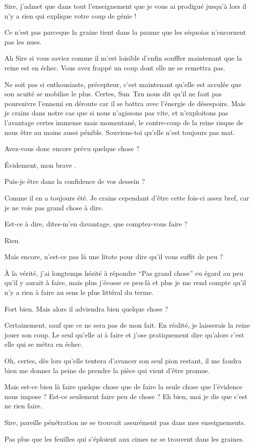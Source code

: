 \begin{drama}
  \alexasspeaks Sire, j’admet que dans tout l’enseignement que je vous ai prodigué jusqu’à lors il n’y a rien qui explique votre coup de génie !

  \elenaspeaks Ce n’est pas parceque la graine tient dans la paume que les séquoias n’encornent pas les nues.

  \alexasspeaks Ah Sire si vous saviez comme il m’est loisible d’enfin souffler maintenant que la reine est en échec. Vous avez frappé un coup dont elle ne se remettra pas.

  \elenaspeaks Ne soit pas si enthousiaste, précepteur, c’est maintenant qu’elle est acculée que son acuité se mobilise le plus. Certes, Sun~Tzu nous dit qu’il ne faut pas poursuivre l’ennemi en déroute car il se battra avec l’énergie de désespoirs. Mais je crains dans notre cas que si nous n’agissons pas vite, et n’exploitons pas l’avantage certes immense mais momentané, le contre-coup de la reine risque de nous être au moins aussi pénible. Souviens-toi qu’elle n’est toujours pas mat.

  \alexasspeaks Avez-vous donc encore prévu quelque chose ?

  \elenaspeaks Évidement, mon brave \alexas.

  \alexasspeaks Puis-je être dans la confidence de vos dessein ?

  \elenaspeaks Comme il en a toujours été. Je crains cependant d’être cette fois-ci assez bref, car je ne vois pas grand chose à dire.

  \alexasspeaks Est-ce à dire, dites-m’en davantage, que comptez-vous faire ?

  \elenaspeaks Rien.

  \alexasspeaks Mais encore, n’est-ce pas là une litote pour dire qu’il vous suffit de peu ?

  \elenaspeaks À la vérité, j’ai longtemps hésité à répondre \enquote{Pas grand chose} eu égard au peu qu’il y aurait à faire, mais plus j’écosse ce peu-là et plus je me rend compte qu’il n’y a rien à faire au sens le plus littéral du terme.

  \alexasspeaks Fort bien. Mais alors il adviendra bien quelque chose ?

  \elenaspeaks Certainement, sauf que ce ne sera pas de mon fait. En réalité, je laisserais la reine jouer son coup. Le seul qu’elle ai à faire et j’ose pratiquement dire qu’alors c’est elle qui se métra en échec.

  Oh, certes, dès lors qu’elle tentera d’avancer son seul pion restant, il me faudra bien me donner la peine de prendre la pièce qui vient d’être promue.

  Mais est-ce bien là faire quelque chose que de faire la seule chose que l’évidence nous impose ? Est-ce seulement faire peu de chose ? Eh bien, moi je dis que c’est ne rien faire.

  \alexasspeaks Sire, pareille pénétration ne se trouvait assurément pas dans mes enseignements.

  \elenaspeaks Pas plus que les feuilles qui s’éploient aux cimes ne se trouvent dans les graines.

\end{drama}

